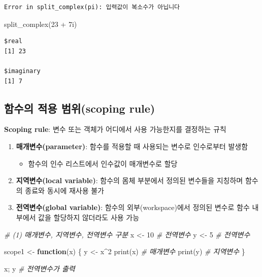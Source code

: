 \documentclass[
  11pt,
]{krantz}
\newenvironment{Shaded}{\begin{snugshade}}{\end{snugshade}}
\newcommand{\CommentTok}[1]{\textcolor[rgb]{0.37,0.37,0.37}{\textit{#1}}}
\newcommand{\ControlFlowTok}[1]{\textcolor[rgb]{0.27,0.27,0.27}{\textbf{#1}}}
\newcommand{\DecValTok}[1]{\textcolor[rgb]{0.06,0.06,0.06}{#1}}
\newcommand{\FunctionTok}[1]{\textcolor[rgb]{0,0,0}{#1}}
\newcommand{\NormalTok}[1]{#1}
\newcommand{\OtherTok}[1]{\textcolor[rgb]{0.37,0.37,0.37}{#1}}
\newcommand{\SpecialCharTok}[1]{\textcolor[rgb]{0,0,0}{#1}}
\providecommand{\tightlist}{%
  \setlength{\itemsep}{0pt}\setlength{\parskip}{0pt}}
\begin{document}
\begin{verbatim}
Error in split_complex(pi): 입력값이 복소수가 아닙니다
\end{verbatim}

\begin{Shaded}
\begin{Highlighting}[]
\FunctionTok{split\_complex}\NormalTok{(}\DecValTok{23} \SpecialCharTok{+}\NormalTok{ 7i)}
\end{Highlighting}
\end{Shaded}

\begin{verbatim}
$real
[1] 23

$imaginary
[1] 7
\end{verbatim}

\normalsize

\hypertarget{uxd568uxc218uxc758-uxc801uxc6a9-uxbc94uxc704scoping-rule}{%
\subsection{함수의 적용 범위(scoping rule)}\label{uxd568uxc218uxc758-uxc801uxc6a9-uxbc94uxc704scoping-rule}}

\textbf{Scoping rule}: 변수 또는 객체가 어디에서 사용 가능한지를 결정하는 규칙

\begin{enumerate}
\def\labelenumi{\arabic{enumi}.}
\tightlist
\item
  \textbf{매개변수(parameter)}: 함수를 적용할 때 사용되는 변수로 인수로부터 발생함

  \begin{itemize}
  \tightlist
  \item
    함수의 인수 리스트에서 인수값이 매개변수로 할당
  \end{itemize}
\item
  \textbf{지역변수(local variable)}: 함수의 몸체 부분에서 정의된 변수들을 지칭하며 함수의 종료와 동시에 재사용 불가
\item
  \textbf{전역변수(global variable)}: 함수의 외부(workspace)에서 정의된 변수로 함수 내부에서 값을 할당하지 않더라도 사용 가능
\end{enumerate}

\footnotesize

\begin{Shaded}
\begin{Highlighting}[]
\CommentTok{\# (1) 매개변수, 지역변수, 전역변수 구분}
\NormalTok{x }\OtherTok{\textless{}{-}} \DecValTok{10} \CommentTok{\# 전역변수}
\NormalTok{y }\OtherTok{\textless{}{-}} \DecValTok{5} \CommentTok{\# 전역변수}

\NormalTok{scope1 }\OtherTok{\textless{}{-}} \ControlFlowTok{function}\NormalTok{(x) \{}
\NormalTok{  y }\OtherTok{\textless{}{-}}\NormalTok{ x}\SpecialCharTok{\^{}}\DecValTok{2}
  \FunctionTok{print}\NormalTok{(x) }\CommentTok{\# 매개변수}
  \FunctionTok{print}\NormalTok{(y) }\CommentTok{\# 지역변수}
\NormalTok{\}}

\NormalTok{x; y }\CommentTok{\# 전역변수가 출력}
\end{Highlighting}
\end{Shaded}
\end{document}
